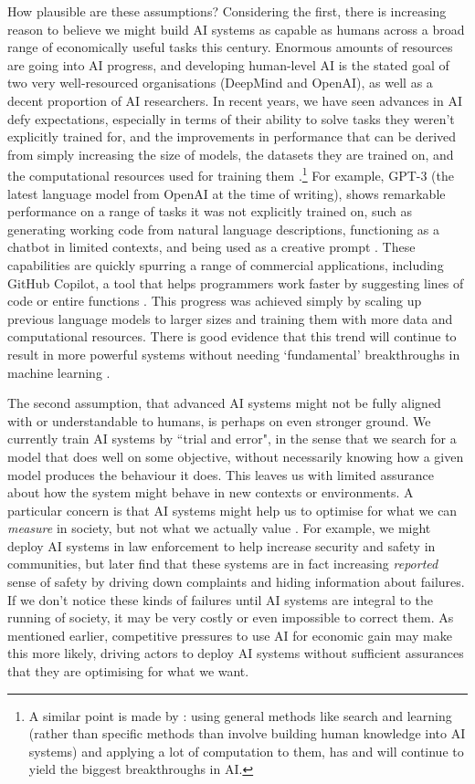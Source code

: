 \documentclass{article}
\begin{document}
How plausible are these assumptions? Considering the first, there is increasing reason to believe we might build AI systems as capable as humans across a broad range of economically useful tasks this century. Enormous amounts of resources are going into AI progress, and developing human-level AI is the stated goal of two very well-resourced organisations (DeepMind and OpenAI), as well as a decent proportion of AI researchers. In recent years, we have seen advances in AI defy expectations, especially in terms of their ability to solve tasks they weren’t explicitly trained for, and the improvements in performance that can be derived from simply increasing the size of models, the datasets they are trained on, and the computational resources used for training them \citep{branwen_scaling_2021}.\footnote{A similar point is made by \citet{sutton_bitter_2019}: using general methods like search and learning (rather than specific methods than involve building human knowledge into AI systems) and applying a lot of computation to them, has and will continue to yield the biggest breakthroughs in AI.} For example, GPT-3 (the latest language model from OpenAI at the time of writing), shows remarkable performance on a range of tasks it was not explicitly trained on, such as generating working code from natural language descriptions, functioning as a chatbot in limited contexts, and being used as a creative prompt \citep{tamkin_understanding_2021}. These capabilities are quickly spurring a range of commercial applications, including GitHub Copilot, a tool that helps programmers work faster by suggesting lines of code or entire functions \citep{chen_evaluating_2021}. This progress was achieved simply by scaling up previous language models to larger sizes and training them with more data and computational resources. There is good evidence that this trend will continue to result in more powerful systems without needing ‘fundamental’ breakthroughs in machine learning \citep{kaplan_scaling_2020}.

The second assumption, that advanced AI systems might not be fully aligned with or understandable to humans, is perhaps on even stronger ground. We currently train AI systems by ``trial and error", in the sense that we search for a model that does well on some objective, without necessarily knowing how a given model produces the behaviour it does. This leaves us with limited assurance about how the system might behave in new contexts or environments. A particular concern is that AI systems might help us to optimise for what we can \textit{measure} in society, but not what we actually value \citep{christiano_what_2019}. For example, we might deploy AI systems in law enforcement to help increase security and safety in communities, but later find that these systems are in fact increasing \textit{reported }sense of safety by driving down complaints and hiding information about failures. If we don’t notice these kinds of failures until AI systems are integral to the running of society, it may be very costly or even impossible to correct them. As mentioned earlier, competitive pressures to use AI for economic gain may make this more likely, driving actors to deploy AI systems without sufficient assurances that they are optimising for what we want.
\end{document}
